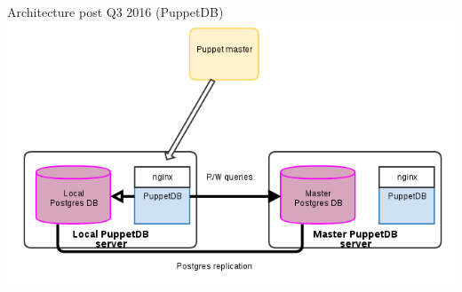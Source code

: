\documentclass{beamer}
\begin{document}
    \begin{frame}{Architecture post Q3 2016 (PuppetDB)}
        \includegraphics[width=\textwidth, height=\textheight]{Puppetdb-diagram.png}
    \end{frame}
\end{document}
